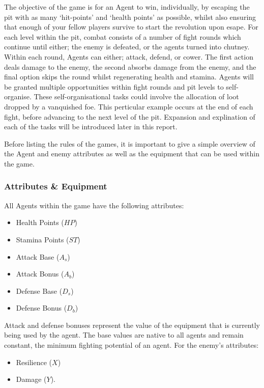 The objective of the game is for an Agent to win, individually, by escaping the pit with as many `hit-points' and `health points' as possible, whilst also ensuring that enough of your fellow players survive to start the revolution upon esape. 
For each level within the pit, combat consists of a number of fight rounds which continue until either; the enemy is defeated, or the agents turned into chutney. Within each round, Agents can either; attack, defend, or cower. The first action deals damage to the enemy, the second absorbs damage from the enemy, and the final option skips the round whilst regenerating health and stamina.
Agents will be granted multiple opportunities within fight rounds and pit levels to self-organise. These self-organisational tasks could involve the allocation of loot dropped by a vanquished foe. This perticular example occurs at the end of each fight, before advancing to the next level of the pit. Expansion and explination of each of the tasks will be introduced later in this report. 

Before listing the rules of the games, it is important to give a simple overview of the Agent and enemy attributes as well as the equipment that can be used within the game.  

\subsubsection{Attributes \& Equipment}

All Agents within the game have the following attributes:

\begin{itemize} 
    \item Health Points ($HP$)
    \item Stamina Points ($ST$)
    \item Attack Base ($A_s$)
    \item Attack Bonus ($A_b$)
    \item Defense Base ($D_s$)
    \item Defense Bonus ($D_b$)
\end{itemize}

Attack and defense bonuses represent the value of the equipment that is currently being used by the agent. The base values are native to all agents and remain constant, the minimum fighting potential of an agent. For the enemy's attributes:

\begin{itemize}
    \item Resilience ($X$)
    \item Damage ($Y$).
\end{itemize}

